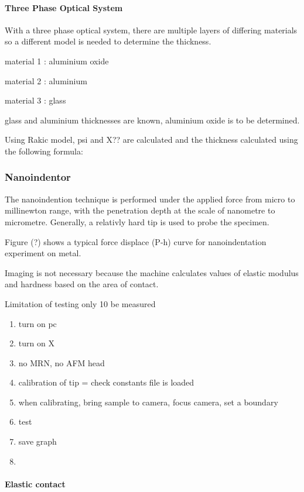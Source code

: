 \documentclass{article}
\begin{document}
\paragraph*{Three Phase Optical System}

With a three phase optical system, there are multiple layers of differing materials
so a different model is needed to determine the thickness.

material 1 : aluminium oxide

material 2 : aluminium 

material 3 : glass 

glass and aluminium thicknesses are known, aluminium oxide is to be determined.

Using Rakic model, psi and X?? are calculated and the thickness calculated using 
the following formula:

\subsubsection{Nanoindentor}
The nanoindention technique is performed under the applied force
from micro to millinewton range, with the penetration depth
at the scale of nanometre to micrometre. Generally, a relativly
hard tip is used to probe the specimen.

Figure (?) shows a typical force displace (P-h) curve for 
nanoindentation experiment on metal.

Imaging is not necessary because the machine calculates values of elastic modulus and
hardness based on the area of contact.

Limitation of testing only 10%
be measured

\begin{enumerate}
    \item turn on pc 
    \item turn on X
    \item no MRN, no AFM head 
    \item calibration of tip = check constants file is loaded 
    \item when calibrating, bring sample to camera, focus camera, set a boundary
    \item test 
    \item save graph 
    \item 
\end{enumerate}

\paragraph{Elastic contact}
\end{document}

